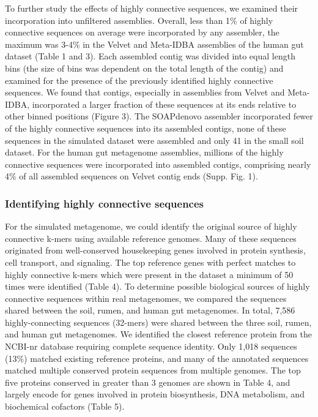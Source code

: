 \documentclass[10pt]{article}
\begin{document}
To further study the effects of highly connective sequences, we examined their incorporation into unfiltered assemblies.   Overall, less than 1\% of highly connective sequences on average were incorporated by any assembler, the maximum was 3-4\% in the Velvet and Meta-IDBA assemblies of the human gut dataset (Table 1 and 3).  Each assembled contig was divided into equal length bins (the size of bins was dependent on the total length of the contig) and examined for the presence of the previously identified highly connective sequences.  We found that contigs, especially in assemblies from Velvet and Meta-IDBA, incorporated a larger fraction of these sequences at its ends relative to other binned positions (Figure 3).  The SOAPdenovo assembler incorporated fewer of the highly connective sequences into its assembled contigs, none of these sequences in the simulated dataset were assembled and only 41 in the small soil dataset.  For the human gut metagenome assemblies, millions of the highly connective sequences were incorporated into assembled contigs, comprising nearly 4\% of all assembled sequences on Velvet contig ends (Supp. Fig. 1).

\subsubsection*{Identifying highly connective sequences}

For the simulated metagenome, we could identify the original source of highly connective k-mers using available reference genomes.  Many of these sequences originated from well-conserved housekeeping genes involved in protein synthesis, cell transport, and signaling.  The top reference genes with perfect matches to highly connective k-mers which were present in the dataset a minimum of 50 times were identified (Table 4).  To determine possible biological sources of highly connective sequences within real metagenomes, we compared the sequences shared between the soil, rumen, and human gut metagenomes.  In total, 7,586 highly-connecting sequences (32-mers) were shared between the three soil, rumen, and human gut metagenomes.  We identified the closest reference protein from the NCBI-nr database requiring complete sequence identity.  Only 1,018 sequences (13\%) matched existing reference proteins, and many of the annotated sequences matched multiple conserved protein sequences from multiple genomes.  The top five proteins conserved in greater than 3 genomes are shown in Table 4, and largely encode for genes involved in protein biosynthesis, DNA metabolism, and biochemical cofactors (Table 5).
\end{document}
